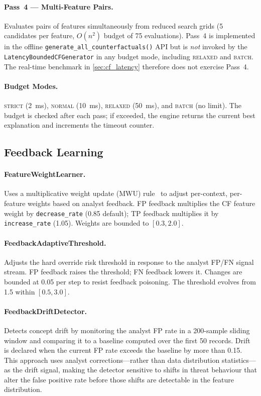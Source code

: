 \documentclass[preprint,12pt,authoryear]{elsarticle}
\begin{document}
\paragraph{Pass~4 --- Multi-Feature Pairs.}
Evaluates pairs of features simultaneously from reduced search grids (5
candidates per feature, $O(n^2)$ budget of 75 evaluations). Pass~4 is
implemented in the offline \texttt{generate\_all\_counterfactuals()} API but is
\emph{not} invoked by the \texttt{LatencyBoundedCFGenerator} in any budget mode,
including \textsc{relaxed} and \textsc{batch}. The real-time benchmark in
\cref{sec:cf_latency} therefore does not exercise Pass~4.

\paragraph{Budget Modes.}
\textsc{strict} (\SI{2}{\ms}), \textsc{normal} (\SI{10}{\ms}), \textsc{relaxed}
(\SI{50}{\ms}), and \textsc{batch} (no limit). The budget is checked after each
pass; if exceeded, the engine returns the current best explanation and increments
the timeout counter.

\subsection{Feedback Learning}
\label{subsec:feedback}

\paragraph{FeatureWeightLearner.}
Uses a multiplicative weight update (MWU) rule~\citep{Littlestone1994} to adjust
per-context, per-feature weights based on analyst feedback. FP feedback
multiplies the CF feature weight by \texttt{decrease\_rate} (0.85 default); TP
feedback multiplies it by \texttt{increase\_rate} (1.05). Weights are bounded to
$[0.3, 2.0]$.

\paragraph{FeedbackAdaptiveThreshold.}
Adjusts the hard override risk threshold in response to the analyst FP/FN signal
stream. FP feedback raises the threshold; FN feedback lowers it. Changes are
bounded at 0.05 per step to resist feedback poisoning. The threshold evolves
from 1.5 within $[0.5, 3.0]$.

\paragraph{FeedbackDriftDetector.}
Detects concept drift by monitoring the analyst FP rate in a 200-sample sliding
window and comparing it to a baseline computed over the first 50 records. Drift
is declared when the current FP rate exceeds the baseline by more than 0.15.
This approach uses analyst corrections---rather than data distribution
statistics---as the drift signal, making the detector sensitive to shifts in
threat behaviour that alter the false positive rate before those shifts are
detectable in the feature distribution.
\end{document}
